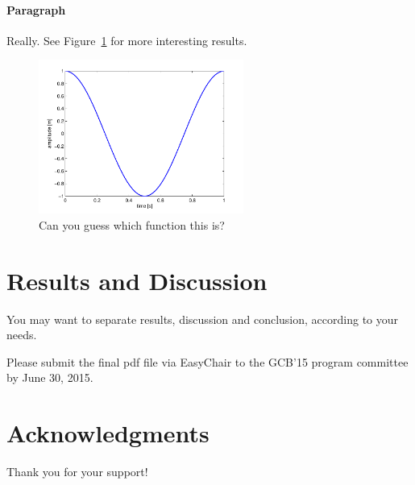 \documentclass[fleqn,10pt,twoside]{gcb15submission}
\begin{document}
\paragraph{Paragraph}
Really.
See Figure~\ref{fig:results} for more interesting results.

\begin{figure}[ht]\centering
\includegraphics[width=0.6\textwidth]{results}
\caption{Can you guess which function this is?}
\label{fig:results}
\end{figure}



\section*{Results and Discussion}

You may want to separate results, discussion and conclusion, according to your needs.

Please submit the final pdf file via EasyChair to the GCB'15 program committee by June 30, 2015. 


\section*{Acknowledgments}
Thank you for your support!



\end{document}
